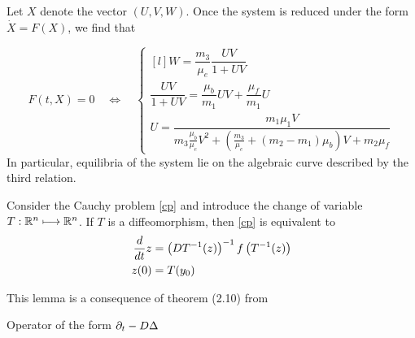 \documentclass{amsart}
\begin{document}
\begin{lemma}
Let $X$ denote the vector $(U, V, W)$. Once the system is reduced under the form $\dot X = F(X)$, we find that 

$$F(t, X) = 0 \quad \iff\quad \left\{\begin{matrix*}[l] W = \dfrac{m_3}{\mu_e} \dfrac{UV}{1 + UV} \\[1.2em] \dfrac{UV}{1 + UV} = \dfrac{\mu_b}{m_1} UV + \dfrac{\mu_f}{m_1} U \\[1.2em] U = \dfrac{m_1 \mu_1 V}{m_3 \frac{\mu_b}{\mu_e} V^2 + \left(\frac{m_3}{\mu_e} + (m_2 - m_1) \mu_b \right)V + m_2 \mu_f}\end{matrix*}\right.$$
\medskip
In particular, equilibria of the system lie on the algebraic curve described by the third relation.
    
\end{lemma}

\begin{lemma} Consider the Cauchy problem \eqref{cp} and introduce the change of variable $T : \mathbb{R}^n \longmapsto \mathbb{R}^n$. If $T$ is a diffeomorphism, then \eqref{cp} is equivalent to 
\begin{align}
\label{cp2}
\dfrac{d}{dt} z &= \left( DT^{-1}(z) \right)^{-1} f\left( T^{-1}(z) \right) \notag \\ z(0) &= T(y_0) \notag
\end{align}

\end{lemma}

This lemma is a consequence of theorem (2.10) from \cite{philip_2022}

\begin{remark}
Operator of the form $\partial_t - D \Delta$
\end{remark}
\end{document}
